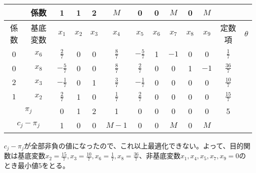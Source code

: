 \documentclass[uplatex,dvipdfmx,a4paper,10pt]{jsarticle}
\begin{document}
\begin{table}[H]
  \centering
  \fontsize{30pt}{30pt}
  \small
  \begin{tabular}{|c|c|c|c|c|c|c|c|c|c|c|c|c|}
\hline
 & 係数 & 1& 1 & 2 & \(M\) & 0 & 0 & \(M\) & 0 & \(M\) & \multicolumn{2}{c|}{} \\
\hline
係数 & 基底変数  & \(x_1\) & \(x_2\) & \(x_3\) & \(x_4\) & \(x_5\) & \(x_6\) & \(x_7\) & \(x_8\) & \(x_9\) & 定数項 & \(\theta \) \\
\hline
0 & \(x_6\) & \(\frac{2}{7}\) & 0 & 0 & \(\frac{8}{7}\) &  \(-\frac{5}{7}\)  & 1 & \(-1\) & 0& 0 &  \(\frac{1}{7}\) &  \(\) \\
\hline
0 & \(x_8\) &  \(-\frac{5}{7}\)  &0 & 0 &  \(\frac{8}{7}\)  &  \(\frac{2}{7}\)  & 0 & 0 & 1 & \(-1\) &   \(\frac{36}{7}\)  &  \(\) \\

\hline
\(2\) & \(x_3\) &  \(-\frac{1}{7}\)  & 0 & 1 &  \(\frac{3}{7}\)  &  \(-\frac{1}{7}\)  & 0 & 0 & 0 & 0 &  \(\frac{10}{7}\)  & \(\)\\

\hline
\(1\) & \(x_2\) & \(\frac{2}{7}\) & 1 & 0 &  \(\frac{1}{7}\)  &  \(\frac{2}{7}\)  & 0 & 0 & 0 & 0 &  \(\frac{15}{7}\) & \(\) \\
 \hline

\multicolumn{2}{|c|}{ \(\pi_j\)} & 0 & 1 & 2 & 1 & 0 & 0 & 0 & 0 & 0 & 5  &\\
\hline
\multicolumn{2}{|c|}{ \(c_j-\pi_j\)} & 1 & 0 & 0 & \(M-1\) & 0 & 0 & \(M\) & 0 & \(M\)  &  &\\

 \hline
\end{tabular}
\end{table}

\(c_j-\pi_j\)が全部非負の値になったので、これ以上最適化できない。よって、目的関数は基底変数\(x_2=\frac{15}{7}, x_3 = \frac{10}{7}, x_6 = \frac{1}{7}, x_8 = \frac{36}{7} \)、非基底変数\(x_1,x_4,x_5,x_7,x_9=0\)のとき最小値5をとる。




    
    
    \appendix
    \setcounter{figure}{0}
    \setcounter{table}{0}
    \renewcommand{\thetable}{\Alph{section}\arabic{table}}
    \renewcommand{\thefigure}{\Alph{section}\arabic{figure}}
    \makeatletter 
    \newcommand{\section@cntformat}{付録 \thesection:\ }
    \makeatother
    
    
\end{document}
